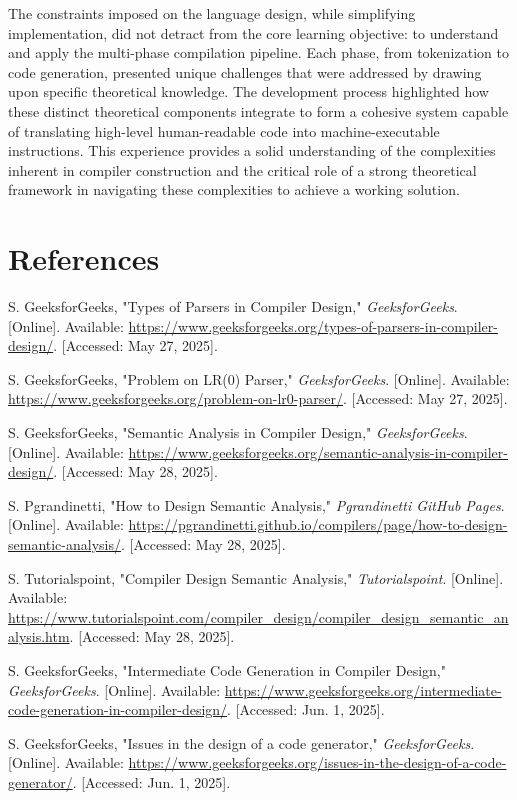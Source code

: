 \documentclass[12pt, letterpaper]{article}
\begin{document}
The constraints imposed on the language design, while simplifying implementation, did not detract from the core learning objective: to understand and apply the multi-phase compilation pipeline. Each phase, from tokenization to code generation, presented unique challenges that were addressed by drawing upon specific theoretical knowledge. The development process highlighted how these distinct theoretical components integrate to form a cohesive system capable of translating high-level human-readable code into machine-executable instructions. This experience provides a solid understanding of the complexities inherent in compiler construction and the critical role of a strong theoretical framework in navigating these complexities to achieve a working solution.


\section{References}

\begin{thebibliography}{9}

S. GeeksforGeeks, "Types of Parsers in Compiler Design," \emph{GeeksforGeeks}. [Online]. Available: \url{https://www.geeksforgeeks.org/types-of-parsers-in-compiler-design/}. [Accessed: May 27, 2025].

S. GeeksforGeeks, "Problem on LR(0) Parser," \emph{GeeksforGeeks}. [Online]. Available: \url{https://www.geeksforgeeks.org/problem-on-lr0-parser/}. [Accessed: May 27, 2025].

S. GeeksforGeeks, "Semantic Analysis in Compiler Design," \emph{GeeksforGeeks}. [Online]. Available: \url{https://www.geeksforgeeks.org/semantic-analysis-in-compiler-design/}. [Accessed: May 28, 2025].

S. Pgrandinetti, "How to Design Semantic Analysis," \emph{Pgrandinetti GitHub Pages}. [Online]. Available: \url{https://pgrandinetti.github.io/compilers/page/how-to-design-semantic-analysis/}. [Accessed: May 28, 2025].

S. Tutorialspoint, "Compiler Design Semantic Analysis," \emph{Tutorialspoint}. [Online]. Available: \url{https://www.tutorialspoint.com/compiler_design/compiler_design_semantic_analysis.htm}. [Accessed: May 28, 2025].

S. GeeksforGeeks, "Intermediate Code Generation in Compiler Design," \emph{GeeksforGeeks}. [Online]. Available: \url{https://www.geeksforgeeks.org/intermediate-code-generation-in-compiler-design/}. [Accessed: Jun. 1, 2025].

S. GeeksforGeeks, "Issues in the design of a code generator," \emph{GeeksforGeeks}. [Online]. Available: \url{https://www.geeksforgeeks.org/issues-in-the-design-of-a-code-generator/}. [Accessed: Jun. 1, 2025].

\end{thebibliography}
\end{document}
